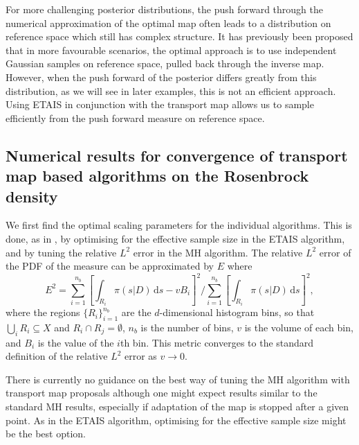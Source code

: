 \documentclass[final]{siamltex}
\newcommand{\edit}[1]{{\color{red} #1}}  %
\providecommand{\DIFaddbegin}{} %
\providecommand{\DIFaddend}{} %
\newcommand{\DIFaddincludegraphics}[2][]{{\color{blue}\fbox{\DIFOincludegraphics[#1]{#2}}}} %
\DeclareRobustCommand{\DIFaddbegin}{\DIFOaddbegin \let\includegraphics\DIFaddincludegraphics} %
\DeclareRobustCommand{\DIFaddend}{\DIFOaddend \let\includegraphics\DIFOincludegraphics} %
\begin{document}
\DIFaddbegin \edit{For more challenging posterior distributions, the push forward
  through the numerical
approximation of the optimal map often leads to a distribution on
reference space which still has complex structure. It has previously
been proposed that in more favourable scenarios, the optimal approach
is to use independent Gaussian samples on reference space, pulled back
through the inverse map. However, when the push forward of the
posterior differs greatly from this distribution, as we will see in
later examples, this is not an
efficient approach. Using ETAIS in conjunction with the transport map
allows us to sample efficiently from the push forward measure on
reference space.}

\DIFaddend \subsection[Numerical results]{Numerical results for convergence of
  transport map based algorithms on the Rosenbrock density}

We first find the optimal scaling parameters for the individual
algorithms. This is done, as in \cite{cotter2015parallel}, by optimising for the effective sample size in
the ETAIS algorithm, and by tuning the relative $L^2$ error in the MH
algorithm. 
\DIFaddbegin \edit{The relative $L^2$ error of the PDF of the measure can be
  approximated by $E$ where
\begin{equation}\label{eqn:L2_error}
	E^2 = \sum\limits_{i=1}^{n_b}\left[\displaystyle\int_{R_i} \! \pi(s|D) \, \mbox{d}s - vB_i\right]^2 \Big/ \sum\limits_{i=1}^{n_b}\left[\displaystyle\int_{R_i} \! \pi(s|D) \, \mbox{d}s\right]^2,
\end{equation}
where the regions $\{R_i\}_{i=1}^{n_b}$ are the $d$-dimensional
histogram bins, so that $\bigcup_i R_i \subseteq X$ and
$R_i\cap R_j=\emptyset$, $n_b$ is the number of bins, $v$ is the
volume of each bin, and $B_i$ is the value of the $i$th bin. This
metric converges to the standard definition of the relative $L^2$
error as $v\rightarrow 0$.}

\DIFaddend There is currently no
guidance on the best way of tuning the MH algorithm with transport map
proposals although one might expect results similar to the standard MH
results, especially if adaptation of the map is stopped after a given
point. As in the ETAIS algorithm, optimising for the effective sample size might be the best option.
\end{document}
